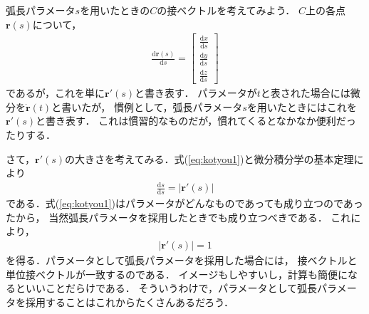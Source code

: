 弧長パラメータ$s$を用いたときの$C$の接ベクトルを考えてみよう．
$C$上の各点$\bm{r}(s)$について，
\begin{align*}
\frac{\mathrm{d} \bm{r} (s) }{\mathrm{d} s} = \left[
\begin{array}{c} 
\displaystyle \frac{ \mathrm{d} x }{\mathrm{d}s} \\
\displaystyle \frac{ \mathrm{d} y }{\mathrm{d}s} \\
\displaystyle \frac{ \mathrm{d} z }{\mathrm{d}s} 
\end{array}
\right]
\end{align*}
であるが，これを単に$\bm{r}'(s)$と書き表す．
パラメータが$t$と表された場合には微分を$\dot{ \bm{r} } (t)$と書いたが，
慣例として，弧長パラメータ$s$を用いたときにはこれを$\bm{r}'(s)$と書き表す．
これは慣習的なものだが，慣れてくるとなかなか便利だったりする．

さて，$\bm{r}'(s)$の大きさを考えてみる．式(\ref{eq:kotyou1})と微分積分学の基本定理により
\begin{align*}
 \frac{\mathrm{d} s}{\mathrm{d} s} = \lvert \bm{r}'(s) \rvert 
\end{align*}
である．式(\ref{eq:kotyou1})はパラメータがどんなものであっても成り立つのであったから，
当然弧長パラメータを採用したときでも成り立つべきである．
これにより，
\begin{align*}
\lvert \bm{r}'(s) \rvert = 1
\end{align*} 
を得る．パラメータとして弧長パラメータを採用した場合には，
接ベクトルと単位接ベクトルが一致するのである．
イメージもしやすいし，計算も簡便になるといいことだらけである．
そういうわけで，パラメータとして弧長パラメータを採用することはこれからたくさんあるだろう．

